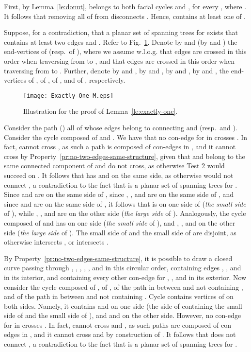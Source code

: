 \documentclass[letter,runningheads]{llncs}
\renewenvironment{proof}
{{\em Proof.\ }}{\hspace*{\fill}\par\vspace{2mm}}
\begin{document}
\begin{proof}
First, by Lemma~\ref{le:donut},  belongs to both facial cycles  and , for every , where . It follows that removing all of  from  disconnects . Hence,  contains at least one of .

Suppose, for a contradiction, that a planar set  of spanning trees for  exists that contains at least two edges  and . Refer to Fig.~\ref{fig:exactly-one}. Denote by  and  (by  and ) the end-vertices of  (resp.\ of ), where we assume w.l.o.g. that edges  are crossed in this order when traversing  from  to , and that edges  are crossed in this order when traversing  from  to . Further, denote by  and , by  and , by  and , by  and ,  the end-vertices of , of , of , and of , respectively.


\begin{figure}[tb]
\begin{center}
\mbox{\texttt{[image: Exactly-One-M.eps]}}
\caption{Illustration for the proof of Lemma~\ref{le:exactly-one}.}
\label{fig:exactly-one}
\end{center}
\end{figure}

Consider the path  () all of whose edges belong to  connecting  and  (resp.\  and ). Consider the cycle  composed of  and . We have that no con-edge  for  in  crosses . In fact,  cannot cross , as such a path is composed of con-edges in , and it cannot cross  by Property~\ref{pr:no-two-edges-same-structure}, given that  and  belong to the same connected component of  and do not cross, as otherwise {\sc Test 2} would succeed on . It follows that  has  and  on the same side, as otherwise  would not connect , a contradiction to the fact that  is a planar set of spanning trees for .  Since  and  are on the same side of , since , , and  are on the same side of , and since  and  are on the same side of , it follows that  is on one side of  ({\em the small side} of ), while , , and  are on the other side ({\em the large side} of ). Analogously, the cycle  composed of  and  has  on one side ({\em the small side} of ), and , , and  on the other side ({\em the large side} of ). The small side of  and the small side of  are disjoint, as otherwise  intersects , or  intersects .

By Property~\ref{pr:no-two-edges-same-structure}, it is possible to draw a closed curve  passing through , , , , , and  in this circular order, containing edges , , and  in its interior, and containing every other con-edge for , , and  in its exterior. Now consider the cycle  composed of , of , of the path  in  between  and  not containing , and of the path  in  between  and  not containing . Cycle  contains vertices of  on both sides. Namely, it contains  and  on one side (the side of  containing the small side of  and the small side of ), and  and  on the other side. However, no con-edge  for  in  crosses . In fact,  cannot cross  and , as such paths are composed of con-edges in , and it cannot cross  and  by construction of . It follows that  does not connect , a contradiction to the fact that  is a planar set of spanning trees for .
\end{proof}
\end{document}
